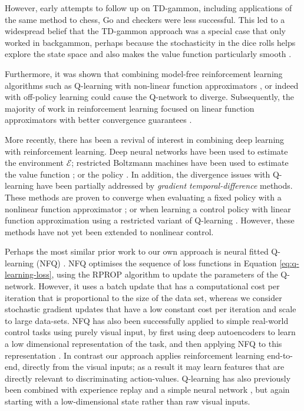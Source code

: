 \documentclass{article} \usepackage{nips13submit_e,times}
\begin{document}
However, early attempts to follow up on TD-gammon, including applications of the same method to chess, Go and checkers were less successful. This led to a widespread belief that the TD-gammon approach was a special case that only worked in backgammon, perhaps because the stochasticity in the dice rolls helps explore the state space and also makes the value function particularly smooth \cite{pollack:td-gammon}.

Furthermore, it was shown that combining model-free reinforcement learning algorithms such as Q-learning with non-linear function approximators \cite{tsitsiklis:td-convergence}, or indeed with off-policy learning \cite{baird:residual} could cause the Q-network to diverge. Subsequently, the majority of work in reinforcement learning focused on linear function approximators with better convergence guarantees \cite{tsitsiklis:td-convergence}.

More recently, there has been a revival of interest in combining deep learning with reinforcement learning. Deep neural networks have been used to estimate the environment $\mathcal{E}$; restricted Boltzmann machines have been used to estimate the value function \cite{sallans:rbm}; or the policy \cite{heess:energy-based}. In addition, the divergence issues with Q-learning have been partially addressed by \emph{gradient temporal-difference} methods. These methods are proven to converge when evaluating a fixed policy with a nonlinear function approximator \cite{maei:nonlinear}; or when learning a control policy with linear function approximation using a restricted variant of Q-learning \cite{maei:gq}. However, these methods have not yet been extended to nonlinear control.

Perhaps the most similar prior work to our own approach is neural fitted Q-learning (NFQ) \cite{riedmiller-nfq}. NFQ optimises the sequence of loss functions in Equation \ref{eq:q-learning-loss}, using the RPROP algorithm to update the parameters of the Q-network. However, it uses a batch update that has a computational cost per iteration that is proportional to the size of the data set, whereas we consider stochastic gradient updates that have a low constant cost per iteration and scale to large data-sets. NFQ has also been successfully applied to simple real-world control tasks using purely visual input, by first using deep autoencoders to learn a low dimensional representation of the task, and then applying NFQ to this representation \cite{lange:dfq}. In contrast our approach applies reinforcement learning end-to-end, directly from the visual inputs; as a result it may learn features that are directly relevant to discriminating action-values.  Q-learning has also previously been combined with experience replay and a simple neural network \cite{lin1993reinforcement}, but again starting with a low-dimensional state rather than raw visual inputs.
\end{document}
